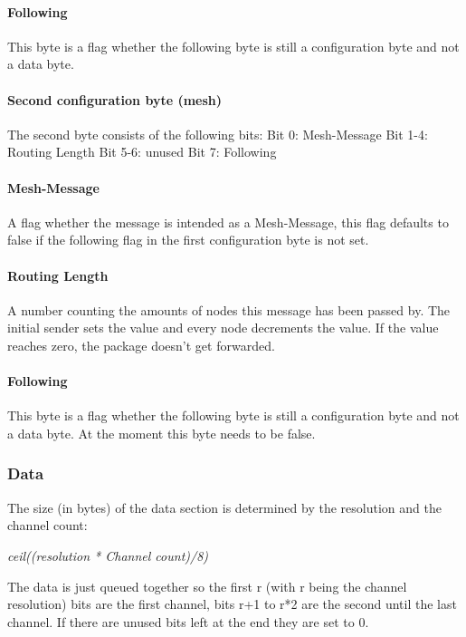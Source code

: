 \documentclass{article}
\begin{document}
    \paragraph{Following}
     This byte is a flag whether the following byte is still a configuration
     byte and not a data byte.

    \paragraph{Second configuration byte (mesh)}
     The second byte consists of the following bits: Bit 0: Mesh-Message Bit
     1-4: Routing Length Bit 5-6: unused Bit 7: Following

    \paragraph{Mesh-Message}
     A flag whether the message is intended as a Mesh-Message, this flag
     defaults to false if the following flag in the first configuration byte is
     not set.

    \paragraph{Routing Length}
     A number counting the amounts of nodes this message has been passed by. The
     initial sender sets the value and every node decrements the value. If the
     value reaches zero, the package doesn't get forwarded.

    \paragraph{Following}
     This byte is a flag whether the following byte is still a configuration
     byte and not a data byte. At the moment this byte needs to be false.

  \subsubsection{Data}
    The size (in bytes) of the data section is determined by
    the resolution and the channel count:

   \emph{ceil((resolution * Channel count)/8)}

   \noindent The data is just queued together so the first r (with r being the channel
   resolution) bits are the first channel, bits r+1 to r*2 are the second
   until the last channel. If there are unused bits left at the end they are
   set to 0.
\end{document}
